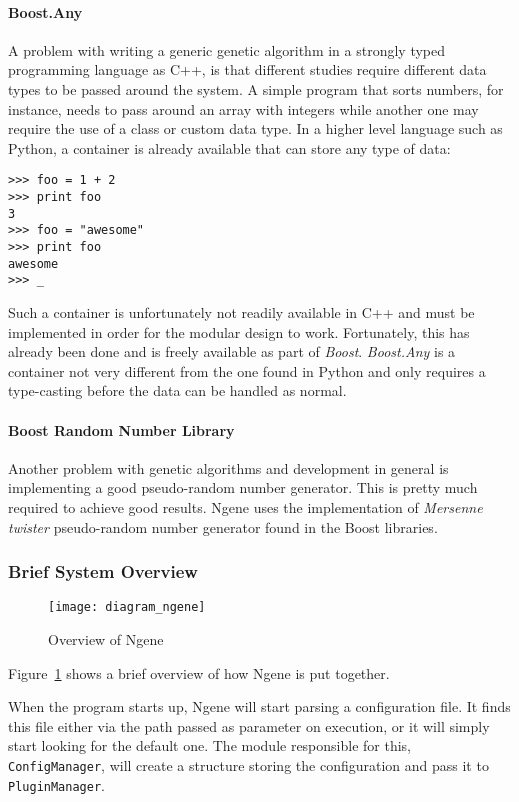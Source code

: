 \paragraph{\textbf{Boost.Any}}\cite{henney2001}
A problem with writing a generic genetic algorithm in a strongly typed programming language as C++, is that different studies require different data types to be passed around the system. A simple program that sorts numbers, for instance, needs to pass around an array with integers while another one may require the use of a class or custom data type. In a higher level language such as Python, a container is already available that can store any type of data:

\begin{verbatim}
>>> foo = 1 + 2
>>> print foo
3
>>> foo = "awesome"
>>> print foo
awesome
>>> _
\end{verbatim}

Such a container is unfortunately not readily available in C++ and must be implemented in order for the modular design to work. Fortunately, this has already been done and is freely available as part of \emph{Boost}. \emph{Boost.Any} is a container not very different from the one found in Python and only requires a type-casting before the data can be handled as normal.

\paragraph{\textbf{Boost Random Number Library}}\cite{maurer2000}
Another problem with genetic algorithms and development in general is implementing a good pseudo-random number generator. This is pretty much required to achieve good results. Ngene uses the implementation of \emph{Mersenne twister} pseudo-random number generator found in the Boost libraries.

\subsubsection{Brief System Overview}
\begin{figure}[!ht]
	\centering
	\texttt{[image: diagram\_ngene]}
	\caption{Overview of Ngene}
	\label{fig:diagram_ngene}
\end{figure}

Figure~\ref{fig:diagram_ngene} shows a brief overview of how Ngene is put together.

When the program starts up, Ngene will start parsing a configuration file. It finds this file either via the path passed as parameter on execution, or it will simply start looking for the default one. The module responsible for this, \texttt{ConfigManager}, will create a structure storing the configuration and pass it to \texttt{PluginManager}.

